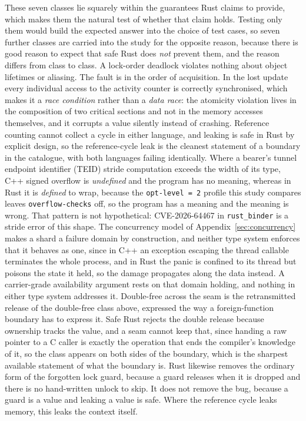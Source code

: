 \documentclass[english,oneside,a4paper,censored,csm,software-track-2020]{HYthesisML}
\begin{document}
\begin{appendices}
These seven classes lie squarely within the guarantees Rust claims to provide, which makes them
the natural test of whether that claim holds. Testing only them would build the expected answer
into the choice of test cases, so seven further classes are carried into the study for the
opposite reason, because there is good reason to expect that safe Rust does \emph{not} prevent
them, and the reason differs from class to class. A lock-order deadlock violates nothing about
object lifetimes or aliasing. The fault is in the order of acquisition. In the lost update every
individual access to the activity counter is correctly synchronised, which makes it a
\emph{race condition} rather than a \emph{data race}: the atomicity violation lives in the
composition of two critical sections and not in the memory accesses themselves, and it corrupts
a value silently instead of crashing. Reference counting cannot collect a cycle in either
language, and leaking is safe in Rust by explicit design, so the reference-cycle leak is the
cleanest statement of a boundary in the catalogue, with both languages failing identically.
Where a bearer's tunnel endpoint identifier (TEID) stride computation exceeds the width of its
type, C++ signed overflow is \emph{undefined} and the program has no meaning, whereas in Rust it
is \emph{defined} to wrap, because the \texttt{opt-level~=~2} profile this study compares leaves
\texttt{overflow-checks} off, so the program has a meaning and the meaning is wrong. That
pattern is not hypothetical: CVE-2026-64467 in \texttt{rust\_binder} is a stride error of this
shape. The concurrency model of Appendix~\ref{sec:concurrency} makes a shard a failure domain by
construction, and neither type system enforces that it behaves as one, since in C++ an exception
escaping the thread callable terminates the whole process, and in Rust the panic is confined to
its thread but poisons the state it held, so the damage propagates along the data instead. A
carrier-grade availability argument rests on that domain holding, and nothing in either type
system addresses it. Double-free across the seam is the retransmitted release of the double-free
class above, expressed the way a foreign-function boundary has to express it. Safe Rust rejects
the double release because ownership tracks the value, and a seam cannot keep that, since
handing a raw pointer to a C caller is exactly the operation that ends the compiler's knowledge
of it, so the class appears on both sides of the boundary, which is the sharpest available
statement of what the boundary is. Rust likewise removes the ordinary form of the forgotten lock
guard, because a guard releases when it is dropped and there is no hand-written unlock to skip.
It does not remove the bug, because a guard is a value and leaking a value is safe. Where the
reference cycle leaks memory, this leaks the context itself.


\end{appendices}
\end{document}
